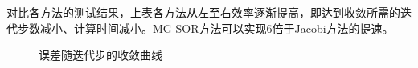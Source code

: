 \documentclass[11pt]{article}
\begin{document}
对比各方法的测试结果，上表各方法从左至右效率逐渐提高，即达到收敛所需的迭代步数减小、计算时间减小。MG-SOR方法可以实现6倍于Jacobi方法的提速。



\begin{figure}[htbp] %
	\centering
	\caption{\label{fig:poisson_error}误差随迭代步的收敛曲线}
\end{figure}
\end{document}
